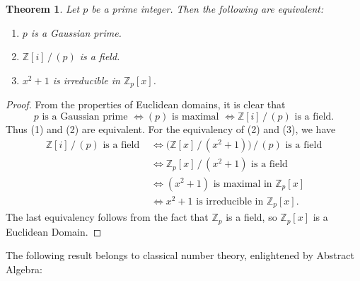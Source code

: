 \documentclass[11pt]{article}
\newtheorem{theorem}{Theorem}
\begin{document}
\begin{adjustwidth}{0.5cm}{}
  \begin{theorem}
    Let $p$ be a prime integer. Then the following are equivalent:
    \begin{enumerate}
      \item $p$ is a Gaussian prime.
      \item $\mathbb{Z}[i] \, / \, (p)$ is a field.
      \item $x^{2} + 1$ is irreducible in $\mathbb{Z}_{p}[x]$.
    \end{enumerate}
  \end{theorem}
  \begin{proof}
    From the properties of Euclidean domains, it is clear that
    \[
      p \text{ is a Gaussian prime } \iff (p) \text{ is maximal } \iff \mathbb{Z}[i] \, / \, (p) \text{ is a field}.
    \]
    Thus (1) and (2) are equivalent. For the equivalency of (2) and (3), we have
    \begin{align*}
      \mathbb{Z}[i] \, / \, (p) \text{ is a field } & \iff \big( \mathbb{Z}[x] \, / \, (x^{2} + 1) \big) \, / \, (p) \text{ is a field} \\
                                                    & \iff \mathbb{Z}_{p}[x] \, / \, (x^{2} + 1) \text{ is a field} \\
                                                    & \iff (x^{2} + 1) \text{ is maximal in } \mathbb{Z}_{p}[x] \\
                                                    & \iff x^{2} + 1 \text{ is irreducible in } \mathbb{Z}_{p}[x].
    \end{align*}
    The last equivalency follows from the fact that $\mathbb{Z}_{p}$ is a field, so $\mathbb{Z}_{p}[x]$ is a Euclidean Domain.
  \end{proof}
\end{adjustwidth}

The following result belongs to classical number theory, enlightened by Abstract Algebra:
\end{document}
